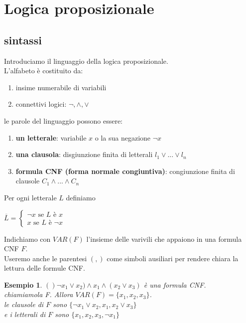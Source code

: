 \documentclass[a4paper,12pt]{article}
\theoremstyle{def}
\theoremstyle{prop}
\theoremstyle{esempio}
\newtheorem*{example}{Esempio}
\theoremstyle{dimostrazione}
\theoremstyle{teo}
\theoremstyle{osservazione}
\begin{document}
\newpage
\section{Logica proposizionale}
\subsection{sintassi}
Introduciamo il linguaggio della logica proposizionale.\\
L'alfabeto è costituito da:
\begin{enumerate}
	\item insime numerabile di variabili
	\item connettivi logici: \(\neg, \land, \lor\)
\end{enumerate}
le parole del linguaggio possono essere:
\begin{enumerate}
	\item \textbf{un letterale}: variabile \(x\) o la sua negazione \(\neg x\)
	\item \textbf{una clausola}: disgiunzione finita di letterali \(l_1 \lor ... \lor l_n\)
	\item \textbf{formula CNF (forma normale congiuntiva)}: congiunzione finita di clausole \(C_1 \land ... \land C_n\)
\end{enumerate}
Per ogni letterale \(L\) definiamo
\begin{center}
	\(\overline{L} = \begin{cases}
		\neg x \text{ se } L \text{ è } x \\
		x \text{ se } L \text{ è } \neg x
	\end{cases}\)
\end{center}
Indichiamo con \(VAR(F)\) l'insieme delle varivili che appaiono in una formula CNF \(F\).\\
Useremo anche le parentesi \((,)\) come simboli ausiliari per rendere chiara la lettura delle formule CNF.\\
\begin{example}
	\(()\neg x_1 \lor x_2) \land x_1 \land (x_2 \lor x_3)\) è una formula CNF.\\
	chiamiamola F. Allora \(VAR(F)=\{x_1,x_2,x_3\}\).\\
	le clausole di \(F\) sono \(\{\neg x_1 \lor x_2, x_1, x_2 \lor x_3\}\)\\
	e i letterali di \(F\) sono \(\{x_1, x_2, x_3, \neg x_1 \}\)
\end{example}
\end{document}
